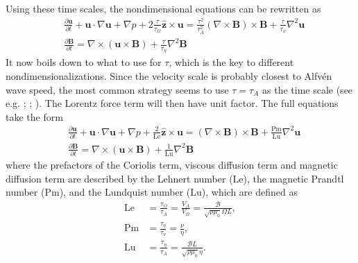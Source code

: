 Using these time scales, the nondimensional equations can be rewritten as
\begin{equation}
    \begin{aligned}
        & \frac{\partial \mathbf{u}}{\partial t} + \mathbf{u}\cdot \nabla \mathbf{u} + \nabla p + 2\frac{\tau}{\tau_\Omega} \hat{\mathbf{z}}\times \mathbf{u} = \frac{\tau^2}{\tau_A^2}(\nabla\times\mathbf{B})\times \mathbf{B} + \frac{\tau}{\tau_\nu} \nabla^2 \mathbf{u} \\ 
        & \frac{\partial \mathbf{B}}{\partial t} = \nabla\times (\mathbf{u}\times \mathbf{B}) + \frac{\tau}{\tau_\eta} \nabla^2 \mathbf{B}
    \end{aligned}
\end{equation}
It now boils down to what to use for $\tau$, which is the key to different nondimensionalizations. Since the velocity scale is probably closest to Alfvén wave speed, the most common strategy seems to use $\tau = \tau_A$ as the time scale (see e.g. \cite{canet_hydromagnetic_2014}; \cite{holdenried-chernoff_long_2021}; \cite{luo_waves_2022}). The Lorentz force term will then have unit factor. The full equations take the form
\begin{equation}
    \begin{aligned}
        & \frac{\partial \mathbf{u}}{\partial t} + \mathbf{u}\cdot \nabla \mathbf{u} + \nabla p + \frac{2}{\mathrm{Le}} \hat{\mathbf{z}}\times \mathbf{u} = (\nabla\times\mathbf{B})\times \mathbf{B} + \frac{\mathrm{Pm}}{\mathrm{Lu}} \nabla^2 \mathbf{u} \\ 
        & \frac{\partial \mathbf{B}}{\partial t} = \nabla\times (\mathbf{u}\times \mathbf{B}) + \frac{1}{\mathrm{Lu}} \nabla^2 \mathbf{B}
    \end{aligned}
\end{equation}
where the prefactors of the Coriolis term, viscous diffusion term and magnetic diffusion term are described by the Lehnert number ($\mathrm{Le}$), the magnetic Prandtl number ($\mathrm{Pm}$), and the Lundquist number ($\mathrm{Lu}$), which are defined as
\begin{equation}
\begin{aligned}
    \mathrm{Le} &= \frac{\tau_\Omega}{\tau_A} = \frac{V_A}{V_\Omega} = \frac{\mathscr{B}}{\sqrt{\rho \mu_0}\Omega L}, \\ 
    \mathrm{Pm} &= \frac{\tau_\eta}{\tau_\nu} = \frac{\nu}{\eta}, \\
    \mathrm{Lu} &= \frac{\tau_\eta}{\tau_A} = \frac{\mathscr{B} L}{\sqrt{\rho \mu_0}\eta}.
\end{aligned}
\end{equation}

